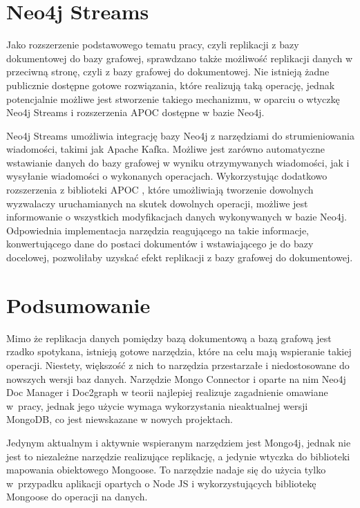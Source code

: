 \documentclass[a4paper,twoside,12pt]{book}
\begin{document}
\section{Neo4j Streams}

Jako rozszerzenie podstawowego tematu pracy, czyli replikacji z bazy dokumentowej do bazy grafowej, sprawdzano także możliwość replikacji danych w przeciwną stronę, czyli z bazy grafowej do dokumentowej. Nie istnieją żadne publicznie dostępne gotowe rozwiązania, które realizują taką operację, jednak potencjalnie możliwe jest stworzenie takiego mechanizmu, w oparciu o wtyczkę Neo4j Streams i rozszerzenia APOC dostępne w bazie Neo4j.

Neo4j Streams \cite{bib:neo4j-streams-github, bib:neo4j-streams} umożliwia integrację bazy Neo4j z narzędziami do strumieniowania wiadomości, takimi jak Apache Kafka. Możliwe jest zarówno automatyczne wstawianie danych do bazy grafowej w wyniku otrzymywanych wiadomości, jak i wysyłanie wiadomości o wykonanych operacjach. Wykorzystując dodatkowo rozszerzenia z biblioteki APOC \cite{bib:neo4j-apoc}, które umożliwiają tworzenie dowolnych wyzwalaczy uruchamianych na skutek dowolnych operacji, możliwe jest informowanie o wszystkich modyfikacjach danych wykonywanych w bazie Neo4j. Odpowiednia implementacja narzędzia reagującego na takie informacje, konwertującego dane do postaci dokumentów i wstawiającego je do bazy docelowej, pozwoliłaby uzyskać efekt replikacji z bazy grafowej do dokumentowej. 

\section{Podsumowanie}

Mimo że replikacja danych pomiędzy bazą dokumentową a bazą grafową jest rzadko spotykana, istnieją gotowe narzędzia, które na celu mają wspieranie takiej operacji. Niestety, większość z nich to narzędzia przestarzałe i niedostosowane do nowszych wersji baz danych. Narzędzie Mongo Connector i oparte na nim Neo4j Doc Manager i Doc2graph w teorii najlepiej realizuje zagadnienie omawiane w~pracy, jednak jego użycie wymaga wykorzystania nieaktualnej wersji MongoDB, co jest niewskazane w nowych projektach. 

Jedynym aktualnym i aktywnie wspieranym narzędziem jest Mongo4j, jednak nie jest to niezależne narzędzie realizujące replikację, a jedynie wtyczka do biblioteki mapowania obiektowego Mongoose. To narzędzie nadaje się do użycia tylko w~przypadku aplikacji opartych o Node JS i wykorzystujących bibliotekę Mongoose do operacji na danych.
\end{document}
